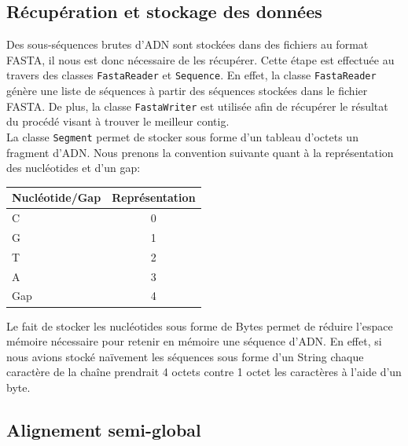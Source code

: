 \subsection{Récupération et stockage des données}
\label{subsection:recStock}

Des sous-séquences brutes d'ADN sont stockées dans des fichiers au format FASTA, il nous est donc nécessaire de les récupérer. Cette étape est effectuée au travers des classes \verb|FastaReader| et \verb|Sequence|. En effet, la classe \verb|FastaReader| génère une liste de séquences à partir des séquences stockées dans le fichier FASTA. De plus, la classe \verb|FastaWriter| est utilisée afin de récupérer le résultat du procédé visant à trouver le meilleur contig.
\\

La classe \verb|Segment| permet de stocker sous forme d'un tableau d'octets un fragment d'ADN. Nous prenons la convention suivante quant à la représentation des nucléotides et d'un gap:
	\begin{center}
		\begin{tabular}{|l|c|}
			\hline
			Nucléotide/Gap & Représentation \\
			\hline
			\hline
			C & 0 \\
			\hline
			G & 1\\
			\hline
			T &  2 \\
			\hline
			A &  3 \\
			\hline
			Gap & 4 \\
			\hline

		\end{tabular}
	\end{center}

	Le fait de stocker les nucléotides sous forme de Bytes permet de réduire l'espace mémoire nécessaire pour retenir en mémoire une séquence d'ADN. En effet, si nous avions stocké naïvement les séquences sous forme d'un String chaque caractère de la chaîne prendrait 4 octets contre 1 octet les caractères à l'aide d'un byte.

\subsection{Alignement semi-global}
\label{subsection:semiGlobal}

